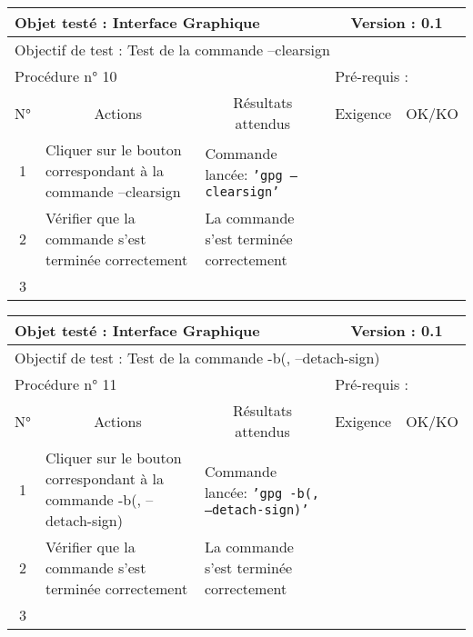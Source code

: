 \documentclass{../res/univ-projet}
\begin{document}
\begin{center}
\begin{tabular}{|c|p{5cm}|p{5cm}|p{1.5cm}|p{1.5cm}|}
\hline
\multicolumn{3}{|l|}{Objet testé : Interface Graphique} & \multicolumn{2}{c|}{Version : 0.1}\\ \hline
\multicolumn{5}{|l|}{Objectif de test : Test de la commande –clearsign}\\ \hline
\multicolumn{3}{|l|}{Procédure n° 10} & \multicolumn{2}{p{3cm}|}{Pré-requis : }\\ \hline
\multicolumn{1}{|c|}{N°} & \multicolumn{1}{c|}{Actions} & \multicolumn{1}{c|}{Résultats attendus} & 
\multicolumn{1}{c|}{Exigence} & \multicolumn{1}{c|}{OK/KO}\\ \hline
1 & Cliquer sur le bouton correspondant à la commande –clearsign & Commande lancée: \texttt{'gpg –clearsign'} &  & \\
2 & Vérifier que la commande s'est terminée correctement & La commande s'est terminée correctement &  & \\
3 &  &  &  & \\ \hline
\end{tabular}
\vskip 2.2cm


\begin{tabular}{|c|p{5cm}|p{5cm}|p{1.5cm}|p{1.5cm}|}
\hline
\multicolumn{3}{|l|}{Objet testé : Interface Graphique} & \multicolumn{2}{c|}{Version : 0.1}\\ \hline
\multicolumn{5}{|l|}{Objectif de test : Test de la commande -b(, –detach-sign)}\\ \hline
\multicolumn{3}{|l|}{Procédure n° 11} & \multicolumn{2}{p{3cm}|}{Pré-requis : }\\ \hline
\multicolumn{1}{|c|}{N°} & \multicolumn{1}{c|}{Actions} & \multicolumn{1}{c|}{Résultats attendus} & 
\multicolumn{1}{c|}{Exigence} & \multicolumn{1}{c|}{OK/KO}\\ \hline
1 & Cliquer sur le bouton correspondant à la commande -b(, –detach-sign) & Commande lancée: \texttt{'gpg -b(, –detach-sign)'} &  & \\
2 & Vérifier que la commande s'est terminée correctement & La commande s'est terminée correctement &  & \\
3 &  &  &  & \\ \hline
\end{tabular}
\vskip 2.2cm



\end{center}
\end{document}
